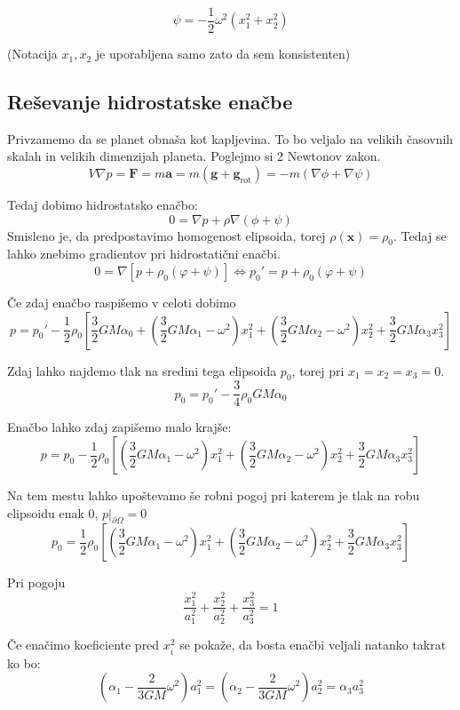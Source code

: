 \documentclass{article}
\theoremstyle{definition}
\theoremstyle{plain}
\numberwithin{definition}{section}
\numberwithin{theorem}{section}
\begin{document}
$$\psi = - \frac{1}{2} \omega^2(x_1^2 + x_2^2)$$

(Notacija $x_1, x_2$ je uporabljena samo zato da sem konsistenten)

\subsection{Reševanje hidrostatske enačbe}
Privzamemo da se planet obnaša kot kapljevina. To bo veljalo na velikih
časovnih skalah in velikih dimenzijah planeta.
Poglejmo si 2 Newtonov zakon.
\begin{equation} \label{eq: newton}	
	V \nabla p
	= \boldsymbol{F} = m \boldsymbol{a} = m (\boldsymbol{g} + \boldsymbol{g}_{\text{rot}}) = 
	-m (\nabla \phi + \nabla \psi)
\end{equation}

Tedaj dobimo hidrostatsko enačbo:
\begin{equation}
	0 = \nabla p + \rho \nabla (\phi + \psi)
	\label{eq: hidrostatska}
\end{equation}
Smisleno je, da predpostavimo homogenost elipsoida, 
torej $\rho(\boldsymbol{x}) = \rho_0$. Tedaj se lahko znebimo gradientov
pri hidrostatični enačbi.
$$0 = \nabla \left[ p + \rho_0 (\varphi + \psi) \right] \iff 
p_{0}' = p + \rho_0 (\varphi + \psi)$$

Če zdaj enačbo raspišemo v celoti dobimo
$$p = p_{0}' - \frac{1}{2} \rho_0 \left[ \frac{3}{2} G M \alpha_0 +
(\frac{3}{2} G M \alpha_1 - \omega^2) x_1^2 +
(\frac{3}{2} G M \alpha_2 - \omega^2) x_2^2 +
\frac{3}{2} G M \alpha_3 x_3^2 
\right]$$

Zdaj lahko najdemo tlak na sredini tega elipsoida $p_0$, torej pri 
$x_1 = x_2 = x_3 = 0$.
$$p_0 = p_0' - \frac{3}{4} \rho_0 G M \alpha_0$$

Enačbo lahko zdaj zapišemo malo krajše:
$$p = p_{0} - \frac{1}{2} \rho_0 \left[
(\frac{3}{2} G M \alpha_1 - \omega^2) x_1^2 +
(\frac{3}{2} G M \alpha_2 - \omega^2) x_2^2 +
\frac{3}{2} G M \alpha_3 x_3^2 
\right]$$

Na tem mestu lahko upoštevamo še robni pogoj pri katerem je tlak na robu
elipsoidu enak 0, $p|_{\partial \Omega} = 0$
$$p_{0} = \frac{1}{2} \rho_0 \left[
(\frac{3}{2} G M \alpha_1 - \omega^2) x_1^2 +
(\frac{3}{2} G M \alpha_2 - \omega^2) x_2^2 +
\frac{3}{2} G M \alpha_3 x_3^2 
\right]$$

Pri pogoju
$$\frac{x_1^2}{a_1^2} + \frac{x_2^2}{a_2^2} + \frac{x_3^2}{a_3^2} = 1$$

Če enačimo koeficiente pred $x_i^2$
se pokaže, da bosta enačbi veljali natanko takrat ko bo:
\begin{equation}
	\left(\alpha_1 - \frac{2}{3GM}\omega^2\right)a_1^2 = 
	\left(\alpha_2 - \frac{2}{3GM}\omega^2\right)a_2^2 = 
	\alpha_3 a_3^2 
	\label{eq: main_zveza}
\end{equation}
\end{document}
